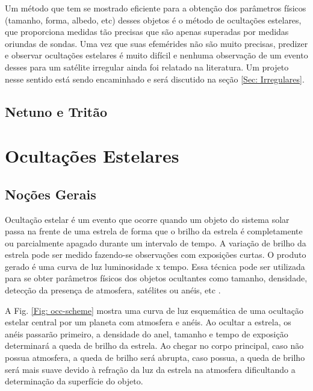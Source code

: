 \documentclass[12pt,a4paper]{monografia}
\begin{document}
Um método que tem se mostrado eficiente para a obtenção dos parâmetros físicos (tamanho, forma, albedo, etc) desses objetos é o método de ocultações estelares, que proporciona medidas tão precisas que são apenas superadas por medidas oriundas de sondas. Uma vez que suas efemérides não são muito precisas, predizer e observar ocultações estelares é muito difícil e nenhuma observação de um evento desses para um satélite irregular ainda foi relatado na literatura. Um projeto nesse sentido está sendo encaminhado e será discutido na seção \ref{Sec: Irregulares}.


\section{Netuno e Tritão}
\label{Sec: Netuno-astrometria}


\chapter{Ocultações Estelares}
\label{Cap: ocultacoes}

\section{Noções Gerais}

\indent \indent Ocultação estelar é um evento que ocorre quando um objeto do sistema solar passa na frente de uma estrela de forma que o brilho da estrela é completamente ou parcialmente apagado durante um intervalo de tempo. A variação de brilho da estrela pode ser medido fazendo-se observações com exposições curtas. O produto gerado é uma curva de luz luminosidade x tempo. Essa técnica pode ser utilizada para se obter parâmetros físicos dos objetos ocultantes como tamanho, densidade, detecção da presença de atmosfera, satélites ou anéis, etc \citep{Elliot1979}.

A Fig. \ref{Fig: occ-scheme} mostra uma curva de luz esquemática de uma ocultação estelar central por um planeta com atmosfera e anéis. Ao ocultar a estrela, os anéis passarão primeiro, a densidade do anel, tamanho e tempo de exposição determinará a queda de brilho da estrela. Ao chegar no corpo principal, caso não possua atmosfera, a queda de brilho será abrupta, caso possua, a queda de brilho será mais suave devido à refração da luz da estrela na atmosfera dificultando a determinação da superfície do objeto.
\end{document}
